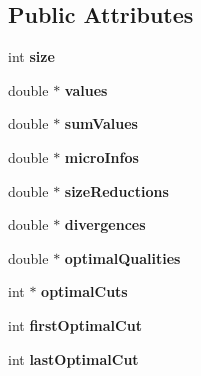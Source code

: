 \subsection*{Public Attributes}
\begin{DoxyCompactItemize}
\item 
\hypertarget{classRing_a9504e0a5404f0fc0a7634e2d10021025}{int {\bfseries size}}\label{classRing_a9504e0a5404f0fc0a7634e2d10021025}

\item 
\hypertarget{classRing_a785645b900755ef5e81633f7122abbe0}{double $\ast$ {\bfseries values}}\label{classRing_a785645b900755ef5e81633f7122abbe0}

\item 
\hypertarget{classRing_aef9d5820742c6251ec52ef9351017cc9}{double $\ast$ {\bfseries sum\-Values}}\label{classRing_aef9d5820742c6251ec52ef9351017cc9}

\item 
\hypertarget{classRing_af55ff3fa2edc4d9b14be1e1bdff07a62}{double $\ast$ {\bfseries micro\-Infos}}\label{classRing_af55ff3fa2edc4d9b14be1e1bdff07a62}

\item 
\hypertarget{classRing_a9c98f90fc9bb2026731ecc45078157de}{double $\ast$ {\bfseries size\-Reductions}}\label{classRing_a9c98f90fc9bb2026731ecc45078157de}

\item 
\hypertarget{classRing_afb390919187938553b890f6ca7ecd9d6}{double $\ast$ {\bfseries divergences}}\label{classRing_afb390919187938553b890f6ca7ecd9d6}

\item 
\hypertarget{classRing_a78f8836d9650b81534b5e903ddb257db}{double $\ast$ {\bfseries optimal\-Qualities}}\label{classRing_a78f8836d9650b81534b5e903ddb257db}

\item 
\hypertarget{classRing_acaa4d3ecf8218e9d28304977389ddd59}{int $\ast$ {\bfseries optimal\-Cuts}}\label{classRing_acaa4d3ecf8218e9d28304977389ddd59}

\item 
\hypertarget{classRing_ae5d182d18fb883761289b7132bc93bd8}{int {\bfseries first\-Optimal\-Cut}}\label{classRing_ae5d182d18fb883761289b7132bc93bd8}

\item 
\hypertarget{classRing_ad846e68433d09f977257148c7ab8514b}{int {\bfseries last\-Optimal\-Cut}}\label{classRing_ad846e68433d09f977257148c7ab8514b}

\end{DoxyCompactItemize}


